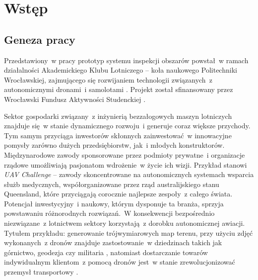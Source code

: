 \chapter{Wstęp} \label{chapter_intro}


\section{Geneza pracy} \label{intro_genesis}

Przedstawiony~w pracy prototyp systemu inspekcji obszarów powstał~w ramach działalności
Akademickiego Klubu Lotniczego -- koła naukowego Politechniki Wrocławskiej, zajmującego
się rozwijaniem technologii związanych~z autonomicznymi dronami~i samolotami
\cite{akl_home_page}. Projekt został sfinansowany przez Wrocławski Fundusz
Aktywności Studenckiej \cite{fast_webpage}.

Sektor gospodarki związany~z inżynierią bezzałogowych maszyn lotniczych znajduje się~w
stanie dynamicznego rozwoju~i generuje coraz większe przychody.
Tym samym przyciąga inwestorów skłonnych zainwestować~w innowacyjne pomysły zarówno 
dużych przedsiębiorstw, jak~i młodych konstruktorów. Międzynarodowe zawody sponsorowane
przez podmioty prywatne~i organizacje rządowe umożliwiają pasjonatom wdrożenie~w życie
ich wizji. Przykład stanowi \textit{UAV Challenge} -- zawody skoncentrowane na
autonomicznych systemach wsparcia służb medycznych, współorganizowane przez rząd
australijskiego stanu Queensland, które przyciągają corocznie najlepsze zespoły~z całego
świata\cite{uav_sponsors}. Potencjał inwestycyjny~i naukowy, którym dysponuje ta branża,
sprzyja powstawaniu różnorodnych rozwiązań.~W konsekwencji bezpośrednio niezwiązane~z lotnictwem sektory korzystają~z dorobku autonomicznej awiacji. Tytułem przykładu: 
generowanie trójwymiarowych map terenu, przy użyciu zdjęć wykonanych~z dronów znajduje
zastostowanie~w dziedzinach takich jak górnictwo, geodezja czy militaria
\cite{uav_photogrametry}, natomiast dostarczanie towarów indywidualnym klientom~z pomocą
dronów jest~w stanie zrewolucjonizować przemysł transportowy \cite{prime_air}.


